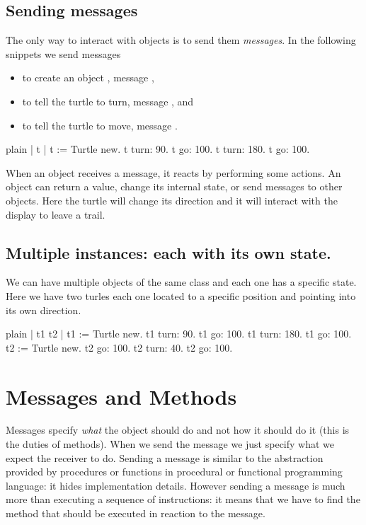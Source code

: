 \documentclass[10pt,twoside,english]{_support/latex/sbabook/sbabook}
\begin{document}
\subsection{Sending messages}
The only way to interact with objects is to send them \textit{messages}. 
In the following snippets we send messages

\begin{itemize}
\item to create an object , message ,
\item to tell the turtle to turn, message , and
\item to tell the turtle to move, message .
\end{itemize}

\begin{displaycode}{plain}
| t |
t := Turtle new. 
t turn: 90.
t go: 100.
t turn: 180. 
t go: 100.
\end{displaycode}

When an object receives a message, it reacts by performing some actions. An object can return a value, change its internal state, or send messages to other objects. Here the turtle will change its direction and it will interact with the display to leave a trail.
\subsection{Multiple instances: each with its own state. }
We can have multiple objects of the same class and each one has a specific state. Here we have two turles each one located to a specific position and pointing into its own direction. 

\begin{displaycode}{plain}
| t1 t2 |
t1 := Turtle new. 
t1 turn: 90.
t1 go: 100.
t1 turn: 180. 
t1 go: 100.
t2 := Turtle new.
t2 go: 100.
t2 turn: 40.
t2 go: 100.
\end{displaycode}
\section{Messages and Methods}
Messages specify \textit{what} the object should do and not how it should do it (this is the duties of methods). When we send the message  we just specify what we expect the receiver to do.  Sending a message is similar to the abstraction provided by procedures or functions in procedural or functional programming language: it hides implementation details. However sending a message is much more than executing a sequence of instructions: it means that we have to find the method that should be executed in reaction to the message. 
\end{document}
